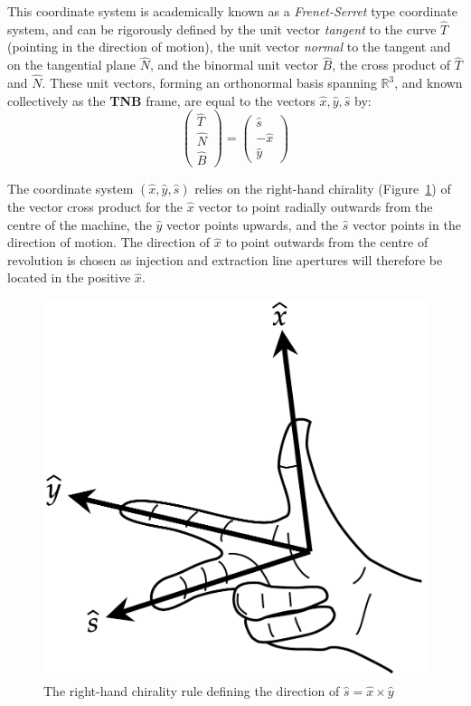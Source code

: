 \documentclass[11pt]{report}
\begin{document}
This coordinate system is academically known as a {\it Frenet-Serret} type coordinate system, and can be rigorously defined by the unit vector {\it tangent} to the curve $\hat T$ (pointing in the direction of motion), the unit vector {\it normal} to the tangent and on the tangential plane $\hat N$, and the binormal unit vector $\hat B$, the cross product of $\hat T$ and $\hat N$. These unit vectors, forming an orthonormal basis spanning $\mathbb{R}^3$, and known collectively as the {\bf TNB} frame, are equal to the vectors $\hat x, \hat y, \hat s$ by:
\begin{equation}
\begin{pmatrix}\hat T\\\hat N\\\hat B \end{pmatrix}=\begin{pmatrix}\hat s\\-\hat x\\\hat y \end{pmatrix}
\end{equation}

The coordinate system $(\hat x, \hat y, \hat s)$ relies on the right-hand chirality (Figure~\ref{fig:rhr}) of the vector cross product for the $\hat x$ vector to point radially outwards from the centre of the machine, the $\hat y$ vector points upwards, and the $\hat s$ vector points in the direction of motion. The direction of $\hat x$ to point outwards from the centre of revolution is chosen as injection and extraction line apertures will therefore be located in the positive $\hat x$.

\begin{figure}[!h]
\begin{center}
\includegraphics[scale=.25]{rhr.pdf}
\caption{The right-hand chirality rule defining the direction of $\hat s = \hat x \times \hat y$}
\label{fig:rhr}
\end{center}
\end{figure}
\end{document}

